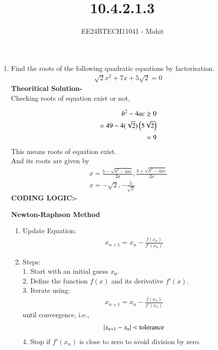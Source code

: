 \documentclass[journal]{IEEEtran}
\numberwithin{equation}{enumi}
\numberwithin{figure}{enumi}
\begin{document}

\title{10.4.2.1.3}
\author{EE24BTECH11041 - Mohit}
{\let\newpage\relax\maketitle}
\begin{enumerate}
\item Find the roots of the following quadratic equations by factorisation.
\begin{align}
\sqrt{2}x^2 + 7x + 5\sqrt{2} = 0
\end{align}
\textbf{Theoritical Solution-}\\
Checking roots of equation exist or not,

\begin{align}
b^2 - 4ac \geq 0 \\
= 49 - 4(\sqrt{2})\left(5\sqrt{2}\right)\\
= 9 
\end{align}
This means roots of equation exist.\\
And its roots are given by 
\begin{align}
x = \frac{b-\sqrt{b^2-4ac}}{2a},\frac{b+\sqrt{b^2-4ac}}{2a}\\
x = -\sqrt{2},-\frac{5}{\sqrt{2}}
\end{align}
\textbf{CODING LOGIC:-}


\textbf{Newton-Raphson Method}
\begin{enumerate}
\item Update Equation:
\begin{align}
 x_{n+1} = x_n - \frac{f(x_n)}{f'(x_n)}   
\end{align}

\item Steps:\\
1. Start with an initial guess $ x_0 $.\\
2. Define the function \( f(x) \) and its derivative  $f'(x)$.\\
3. Iterate using:
   \begin{align}
   x_{n+1} = x_n - \frac{f(x_n)}{f'(x_n)}
   \end{align}
   until convergence, i.e.,
   \begin{align}
   \left\vert x_{n+1} - x_n\right\vert < \text{tolerance}
   \end{align}
4. Stop if $f'(x_n)$ is close to zero to avoid division by zero.


\end{enumerate}
\end{enumerate}
\end{document}
